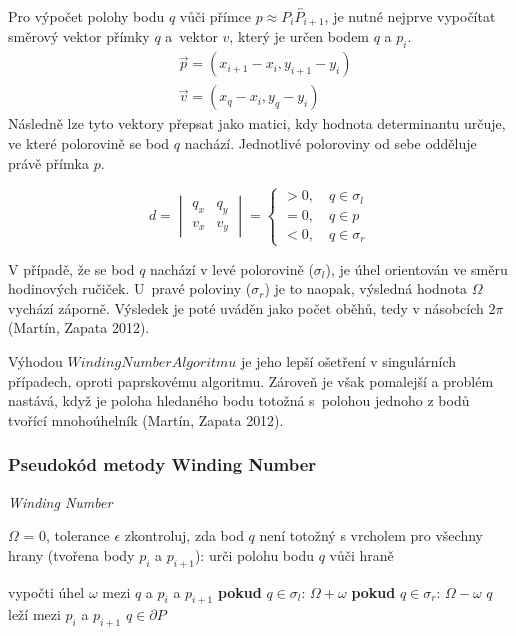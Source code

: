 \documentclass[15pt]{article}
\begin{document}
\begin{spacing}{1.5}
 \noindent Pro výpočet polohy bodu $q$ vůči přímce  $p \approx \overleftrightarrow{P_iP_{i+1}}$, je nutné nejprve vypočítat směrový vektor přímky $q$ a vektor $v$, který je určen bodem $q$ a $p_i$.
 \begin{align}
    \nonumber&\vec{p}=(x_{i+1}-x_i,y_{i+1}-y_i)\\
    \nonumber&\vec{v}=(x_q-x_i,y_q-y_i)
\end{align}
Následně lze tyto vektory přepsat jako matici, kdy hodnota determinantu určuje, ve které polorovině se bod $q$ nachází. Jednotlivé poloroviny od sebe odděluje právě přímka $p$. 

\begin{equation*}
d=\begin{vmatrix} q_x & q_y \\ v_x & v_y  \end{vmatrix}=
\begin{cases}
    >0, \quad q  \in \sigma_l \\
    =0, \quad q  \in p\\
    <0, \quad q \in \sigma_r
\end{cases}
\end{equation*}

\noindent V případě, že se bod $q$ nachází v levé polorovině ($\sigma_l$), je úhel orientován ve směru hodinových ručiček. U pravé poloviny ($\sigma_r$) je to naopak, výsledná hodnota $\Omega$ vychází záporně. Výsledek je poté uváděn jako počet oběhů, tedy v násobcích $2 \pi$ (Martín, Zapata 2012).  

Výhodou $Winding Number Algoritmu$ je jeho lepší ošetření v singulárních případech, oproti paprskovému algoritmu. Zároveň je však pomalejší a problém nastává, když je poloha hledaného bodu totožná s polohou jednoho z bodů tvořící mnohoúhelník (Martín, Zapata 2012). 

\subsubsection*{Pseudokód metody Winding Number}
\begin{algorithm}
    \caption {\textit{Winding Number}}
    \begin{algorithmic}[1]
        \State $\varOmega$ = 0, tolerance $\epsilon$
        \State zkontroluj, zda bod $q$ není totožný s vrcholem
        \State pro všechny hrany (tvořena body $p_i$ a $p_{i+1}$):
        \State \indent urči polohu bodu $q$ vůči hraně
        
        \State \indent vypočti úhel $\omega$ mezi $q$ a $p_i$ a $p_{i+1}$
        \State \indent \textbf{pokud} $q \in \sigma_l$:
        \State \indent  \indent $\varOmega + \omega$
        \State \indent \textbf{pokud} $q \in \sigma_r$:
        \State \indent \indent $\varOmega - \omega$
        \State {} $q$ leží mezi $p_i$ a $p_{i+1}$
        \State \indent \indent $q \in \partial P$
        

\end{algorithmic}
\end{algorithm}
\end{spacing}
\end{document}

